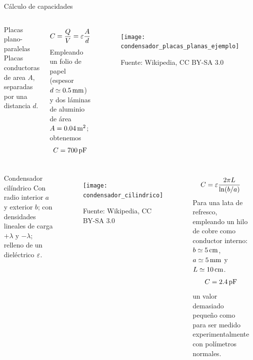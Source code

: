 \documentclass[]{presentation}
\begin{document}
\begin{frame}{Cálculo de capacidades}
\begin{columns}
\begin{exampleblock}{Placas plano-paralelas}
Placas conductoras de area $A$, separadas por una distancia $d$.
\end{exampleblock}
$$
	C = \frac{Q}{V} = \permittivity \frac{A}{d}
$$
\justifying 
Empleando un folio de papel (espesor $d\simeq 0.5\,\mili\meter$) y dos láminas de aluminio de área $A=0.04 \, \meter^2$; obtenemos
$$
	C = 700 \, \pico\Farad
$$
\begin{figure}
\centering
\texttt{[image: condensador\_placas\_planas\_ejemplo]}
\caption{\tiny Fuente: Wikipedia, CC BY-SA 3.0}
\end{figure}
\end{columns}
\end{frame}

\begin{frame}
\begin{columns}
	\begin{exampleblock}{Condensador cilíndrico}
		Con radio interior $a$ y exterior $b$; con densidades lineales de carga $+\lambda$ y $-\lambda$; relleno de un dieléctrico $\permittivity$.
	\end{exampleblock}
	\begin{figure}
		\centering
		\texttt{[image: condensador\_cilindrico]}
		\caption{\tiny Fuente: Wikipedia, CC BY-SA 3.0}
	\end{figure}  	
	$$
		C =  \permittivity  \frac{2 \pi L}{\ln(b/a)}
	$$      
	\justifying
	Para una lata de refresco, empleando un hilo de cobre como conductor interno:  $b \simeq 5 \, \centi\meter$, $a \simeq 5 \, \mili\meter$ y $L\simeq 10 \, \centi\meter$.
	$$
		C = 2.4 \, \pico\Farad
	$$
	un valor demasiado pequeño como para ser medido experimentalmente con polímetros normales.
\end{columns}
\end{frame} 
\end{document}
